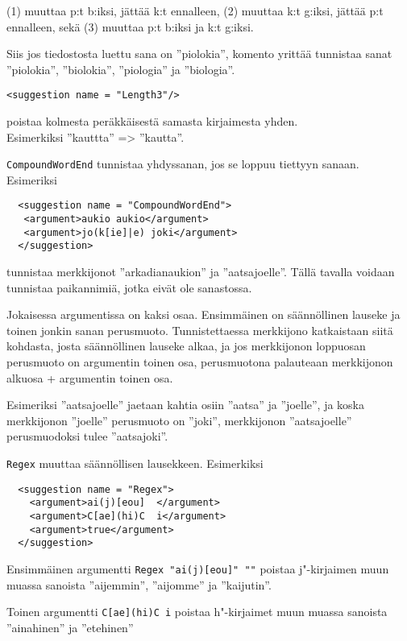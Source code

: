\documentclass[12pt,a4paper]{scrartcl}
\begin{document}
(1) muuttaa p:t b:iksi, jättää k:t ennalleen,
(2) muuttaa k:t g:iksi, jättää p:t ennalleen, sekä
(3) muuttaa p:t b:iksi ja k:t g:iksi.

Siis jos tiedostosta luettu sana on ''piolokia'', komento yrittää
tunnistaa sanat ''piolokia'', ''biolokia'', ''piologia'' ja ''biologia''.


\bigskip
\verb|<suggestion name = "Length3"/>|

poistaa kolmesta peräkkäisestä samasta kirjaimesta
yhden. \\ Esimerkiksi ''kauttta'' => ''kautta''.


\bigskip

\verb|CompoundWordEnd| tunnistaa yhdyssanan, jos se loppuu tiettyyn sanaan. Esimeriksi

\begin{verbatim}
  <suggestion name = "CompoundWordEnd">
   <argument>aukio aukio</argument>
   <argument>jo(k[ie]|e) joki</argument>
  </suggestion>
\end{verbatim}

tunnistaa merkkijonot ''arkadianaukion'' ja ''aatsajoelle''. Tällä
tavalla voidaan tunnistaa paikannimiä, jotka eivät ole sanastossa.

Jokaisessa argumentissa on kaksi osaa. Ensimmäinen on säännöllinen
lauseke ja toinen jonkin sanan perusmuoto. Tunnistettaessa merkkijono
katkaistaan siitä kohdasta, josta säännöllinen lauseke alkaa, ja jos
merkkijonon loppuosan perusmuoto on argumentin toinen osa,
perusmuotona palauteaan merkkijonon alkuosa + argumentin toinen osa.

Esimeriksi ''aatsajoelle'' jaetaan kahtia osiin ''aatsa'' ja
''joelle'', ja koska merkkijonon ''joelle'' perusmuoto on ''joki'',
merkkijonon ''aatsajoelle'' perusmuodoksi tulee ''aatsajoki''.


\bigskip
\verb|Regex| muuttaa säännöllisen lausekkeen. Esimerkiksi


\begin{verbatim}
  <suggestion name = "Regex">
    <argument>ai(j)[eou]  </argument>
    <argument>C[ae](hi)C  i</argument> 
    <argument>true</argument>
  </suggestion>
\end{verbatim}

Ensimmäinen argumentti \verb|Regex "ai(j)[eou]" ""| poistaa
j"-kirjaimen muun muassa sanoista ''aijemmin'', ''aijomme'' ja
''kaijutin''.

Toinen argumentti \verb|C[ae](hi)C i|
poistaa h"-kirjaimet muun muassa sanoista ''ainahinen'' ja
''etehinen''
\end{document}
